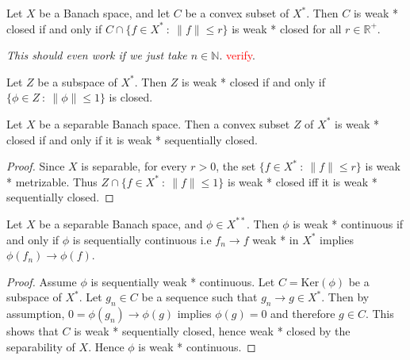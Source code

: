 \begin{theorem}
  Let $X$ be a Banach space, and let $C$ be a convex subset of $X^*$.
  Then $C$ is weak * closed if and only if $C \cap \{ f \in X^*  \ :
  \  \|f\| \le r \}$ is weak * closed for all $r \in \mathbb{R}^+$.

  \textit{This should even work if we just take $n \in \mathbb{N}$}.
  \textcolor{red}{verify}.
\end{theorem}

\begin{corollary}
  Let $Z$ be a subspace of $X^*$. Then $Z$ is weak * closed if and
  only if $\{ \phi \in Z  \ : \  \|\phi\| \le 1 \}$ is closed.
\end{corollary}

\begin{corollary}
  Let $X$ be a separable Banach space. Then a convex subset $Z$ of
  $X^*$ is weak * closed if and only if it is weak * sequentially closed.
\end{corollary}
\begin{proof}
  Since $X$ is separable, for every $r > 0$, the set $ \{ f \in X^*
  \ : \  \|f\| \le r \}$ is weak * metrizable. Thus $Z \cap \{ f \in
  X^*  \ : \  \|f\| \le 1 \}$ is weak * closed iff it is weak *
  sequentially closed.
\end{proof}

\begin{corollary}
  Let $X$ be a separable Banach space, and $\phi \in X^{**}$. Then
  $\phi$ is weak * continuous if and only if $\phi$ is sequentially
  continuous i.e $f_n \to f$ weak * in $X^*$ implies $\phi(f_n) \to \phi(f)$.
\end{corollary}
\begin{proof}
  Assume $\phi$ is sequentially weak * continuous. Let $C =
  \textrm{Ker}(\phi)$ be a subspace of $X^*$. Let $g_n \in C$ be a
  sequence such that $g_n \to g \in X^*$. Then by assumption, $0 =
  \phi(g_n) \to \phi(g)$ implies $\phi(g) = 0$ and therefore $g \in
  C$. This shows  that $ C$ is weak * sequentially closed, hence weak
  * closed by the separability of $X$. Hence $\phi$ is weak * continuous.
\end{proof}

